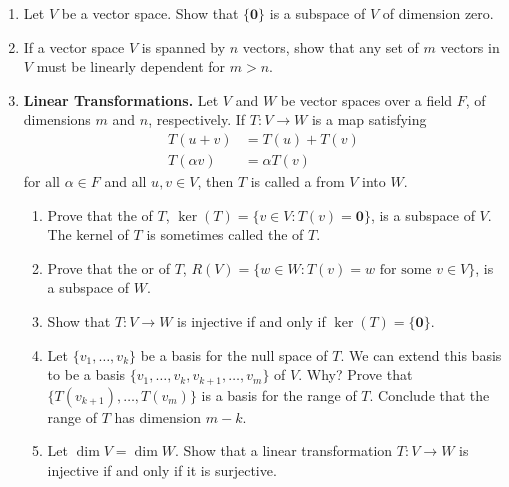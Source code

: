 {\begin{enumerate}
\item
Let $V$ be a vector space. Show that $\{ {\mathbf 0} \}$ is a subspace
of $V$ of dimension zero.


\item
If a vector space $V$ is spanned by $n$ vectors, show that any set of
$m$ vectors in $V$ must be linearly dependent for $m >n$.  


\item \label{vect:linear_transformation}
\textbf{Linear Transformations.}
Let $V$ and $W$ be vector spaces over a field $F$, of dimensions $m$
and $n$, respectively. If $T: V \rightarrow W$ is a map satisfying
\begin{align*}
T( u+ v ) & =  T(u ) + T(v) \\
T( \alpha v ) & =  \alpha T(v)
\end{align*}
for all $\alpha \in F$ and all $u, v \in V$, then $T$ is called a
 from $V$ into $W$. 
\begin{enumerate}

   \item
Prove that the  of $T$, 
$\ker(T) = \{ v \in V : T(v) = 
{\mathbf 0} \}$, is a subspace of $V$. The kernel of $T$ is sometimes
called the  of $T$. 

   \item
Prove that the  or
 of $T$, $R(V) = \{ w \in W : T(v) = w \text{ for
some } v \in V \}$, is a subspace of $W$.

   \item
Show that $T : V \rightarrow W$ is injective if and only if 
$\ker(T) = \{ \mathbf 0 \}$.

   \item
Let $\{ v_1, \ldots, v_k \}$ be a basis for the null space of $T$. We
can extend this basis to be a basis $\{ v_1, \ldots, v_k, v_{k+1},
\ldots, v_m\}$ of $V$. Why?  Prove that $\{ T(v_{k+1}), \ldots, T(v_m)
\}$ is a basis for the range of $T$. Conclude that the range of $T$
has dimension $m-k$.

   \item
Let $\dim V = \dim W$.  Show that a linear transformation $T : V
\rightarrow W$ is injective if and only if it is surjective.


\end{enumerate}
\end{enumerate}}

